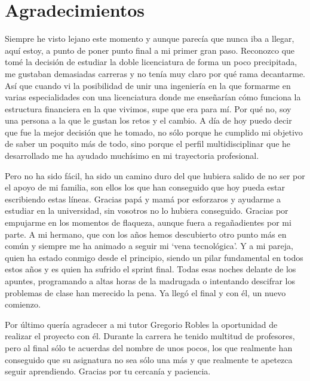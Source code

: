 \documentclass[a4paper, 12pt]{book}
\begin{document}

\chapter*{Agradecimientos}

Siempre he visto lejano este momento y aunque parecía que nunca iba a llegar, aquí estoy, a punto de poner punto final a mi primer gran paso. Reconozco que tomé la decisión de estudiar la doble licenciatura de forma un poco precipitada, me gustaban demasiadas carreras y no tenía muy claro por qué rama decantarme. Así que cuando vi la posibilidad de unir una ingeniería en la que formarme en varias especialidades con una licenciatura donde me enseñarían cómo funciona la estructura financiera en la que vivimos, supe que era para mí. Por qué no, soy una persona a la que le gustan los retos y el cambio. A día de hoy puedo decir que fue la mejor decisión que he tomado, no sólo porque he cumplido mi objetivo de saber un poquito más de todo, sino porque el perfil multidisciplinar que he desarrollado me ha ayudado muchísimo en mi trayectoria profesional.

Pero no ha sido fácil, ha sido un camino duro del que hubiera salido de no ser por el apoyo de mi familia, son ellos los que han conseguido que hoy pueda estar escribiendo estas líneas. Gracias papá y mamá por esforzaros y ayudarme a estudiar en la universidad, sin vosotros no lo hubiera conseguido. Gracias por empujarme en los momentos de flaqueza, aunque fuera a regañadientes por mi parte. A mi hermano, que con los años hemos descubierto otro punto más en común y siempre me ha animado a seguir mi `vena tecnológica'. Y a mi pareja, quien ha estado conmigo desde el principio, siendo un pilar fundamental en todos estos años y es quien ha sufrido el sprint final. Todas esas noches delante de los apuntes, programando a altas horas de la madrugada o intentando descifrar los problemas de clase han merecido la pena. Ya llegó el final y con él, un nuevo comienzo.

Por último quería agradecer a mi tutor Gregorio Robles la oportunidad de realizar el proyecto con él. Durante la carrera he tenido multitud de profesores, pero al final sólo te acuerdas del nombre de unos pocos, los que realmente han conseguido que su asignatura no sea sólo una más y que realmente te apetezca seguir aprendiendo. Gracias por tu cercanía y paciencia.    
\end{document}
